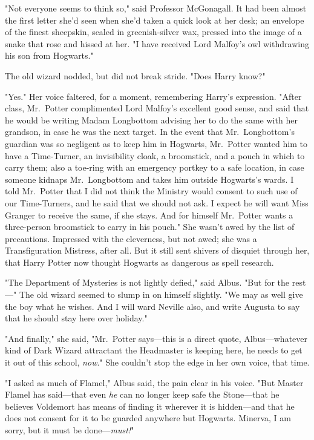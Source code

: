 "Not everyone seems to think so," said Professor McGonagall. It had been almost
the first letter she'd seen when she'd taken a quick look at her desk; an
envelope of the finest sheepskin, sealed in greenish-silver wax, pressed into
the image of a snake that rose and hissed at her. "I have received Lord
Malfoy's owl withdrawing his son from Hogwarts."

The old wizard nodded, but did not break stride. "Does Harry know?"

"Yes." Her voice faltered, for a moment, remembering Harry's expression. "After
class, Mr.~Potter complimented Lord Malfoy's excellent good sense, and said
that he would be writing Madam Longbottom advising her to do the same with her
grandson, in case he was the next target. In the event that Mr.~Longbottom's
guardian was so negligent as to keep him in Hogwarts, Mr.~Potter wanted him to
have a Time-Turner, an invisibility cloak, a broomstick, and a pouch in which
to carry them; also a toe-ring with an emergency portkey to a safe location, in
case someone kidnaps Mr.~Longbottom and takes him outside Hogwarts's wards. I
told Mr.~Potter that I did not think the Ministry would consent to such use of
our Time-Turners, and he said that we should not ask. I expect he will want
Miss Granger to receive the same, if she stays. And for himself Mr.~Potter
wants a three-person broomstick to carry in his pouch." She wasn't awed by the
list of precautions. Impressed with the cleverness, but not awed; she was a
Transfiguration Mistress, after all. But it still sent shivers of disquiet
through her, that Harry Potter now thought Hogwarts as dangerous as spell
research.

"The Department of Mysteries is not lightly defied," said Albus. "But for the
rest---" The old wizard seemed to slump in on himself slightly. "We may as well
give the boy what he wishes. And I will ward Neville also, and write Augusta to
say that he should stay here over holiday."

"And finally," she said, "Mr.~Potter says---this is a direct quote,
Albus---whatever kind of Dark Wizard attractant the Headmaster is keeping here,
he needs to get it out of this school, \emph{now}." She couldn't stop the edge
in her own voice, that time.

"I asked as much of Flamel," Albus said, the pain clear in his voice. "But
Master Flamel has said---that even \emph{he} can no longer keep safe the
Stone---that he believes Voldemort has means of finding it wherever it is
hidden---and that he does not consent for it to be guarded anywhere but
Hogwarts. Minerva, I am sorry, but it must be done---\emph{must!}"

